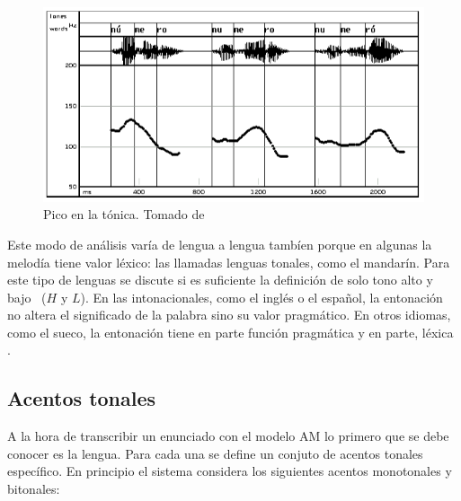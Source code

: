 \begin{figure}
\begin{center}
\includegraphics[width= 0.8\columnwidth]{Graphics/numero}
\caption{Pico en la t\'onica. Tomado de \cite[p.4]{hualde2003modelo}}
\label{numero}
\end{center}
\end{figure}




 Este modo de an\'alisis var\'ia de lengua a lengua tamb\'ien porque en algunas la melod\'ia tiene valor l\'exico: las llamadas lenguas tonales, como el mandar\'in. Para este tipo de lenguas se discute si es suficiente la definici\'on de solo tono alto y bajo ~($H$ y $L$). En las intonacionales, como el inglés o el español, la entonaci\'on no altera el significado de la palabra sino su valor pragm\'atico. En otros idiomas, como el sueco, la entonaci\'on tiene en parte funci\'on pragm\'atica y en parte, l\'exica \cite{hualde2003modelo}.

\subsection{Acentos tonales}
A la hora de transcribir un enunciado con el modelo AM lo primero que se debe conocer es la lengua. Para cada una se define un conjuto de acentos tonales espec\'ifico. En principio el sistema considera los siguientes acentos monotonales y bitonales:

